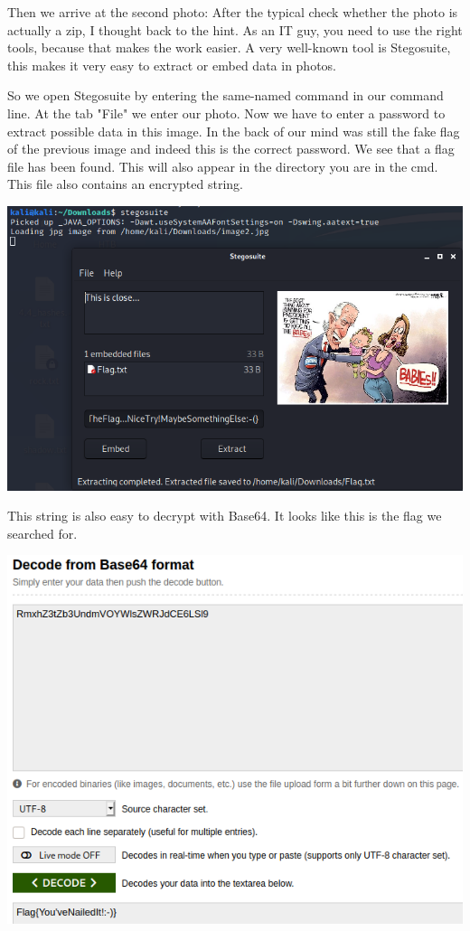 \documentclass[../main.tex]{subfiles}
\begin{document}
Then we arrive at the second photo: After the typical check whether the photo is actually a zip, I thought back to the hint. As an IT guy, you need to use the right tools, because that makes the work easier. A very well-known tool is Stegosuite, this makes it very easy to extract or embed data in photos. 


So we open Stegosuite by entering the same-named command in our command line. At the tab "File" we enter our photo. Now we have to enter a password to extract possible data in this image. In the back of our mind was still the fake flag of the previous image and indeed this is the correct password. We see that a flag file has been found. This will also appear in the directory you are in the cmd. This file also contains an encrypted string.
\begin{center}
    \includegraphics[width=1\linewidth]{images/Robbe/sorry_writeup5.png}
\end{center}

This string is also easy to decrypt with Base64. It looks like this is the flag we searched for.
\begin{center}
    \includegraphics[width=1\linewidth]{images/Robbe/sorry_writeup6.png}
\end{center}
\end{document}
